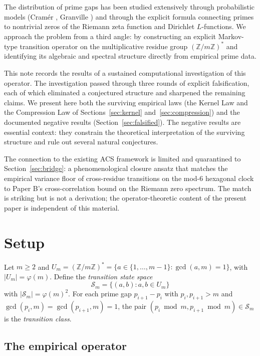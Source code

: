 \documentclass[11pt,a4paper]{article}
\begin{document}
The distribution of prime gaps has been studied extensively through probabilistic models (Cram\'{e}r \cite{Cramer}, Granville \cite{Granville}) and through the explicit formula connecting primes to nontrivial zeros of the Riemann zeta function and Dirichlet $L$-functions. We approach the problem from a third angle: by constructing an explicit Markov-type transition operator on the multiplicative residue group $(\mathbb{Z}/m\mathbb{Z})^*$ and identifying its algebraic and spectral structure directly from empirical prime data.

This note records the results of a sustained computational investigation of this operator. The investigation passed through three rounds of explicit falsification, each of which eliminated a conjectured structure and sharpened the remaining claims. We present here both the surviving empirical laws (the Kernel Law and the Compression Law of Sections~\ref{sec:kernel} and~\ref{sec:compression}) and the documented negative results (Section~\ref{sec:falsified}). The negative results are essential context: they constrain the theoretical interpretation of the surviving structure and rule out several natural conjectures.

The connection to the existing ACS framework \cite{Wallace2026a, WallaceB, WallaceC} is limited and quarantined to Section~\ref{sec:bridge}: a phenomenological closure ansatz that matches the empirical variance floor of cross-residue transitions on the mod-6 hexagonal clock to Paper B's cross-correlation bound on the Riemann zero spectrum. The match is striking but is not a derivation; the operator-theoretic content of the present paper is independent of this material.

\section{Setup}
\label{sec:setup}

Let $m \geq 2$ and $U_m = (\mathbb{Z}/m\mathbb{Z})^* = \{a \in \{1, \ldots, m-1\} : \gcd(a, m) = 1\}$, with $|U_m| = \varphi(m)$. Define the \emph{transition state space}
\begin{equation}
\mathcal{S}_m = \{(a, b) : a, b \in U_m\}
\end{equation}
with $|\mathcal{S}_m| = \varphi(m)^2$. For each prime gap $p_{i+1} - p_i$ with $p_i, p_{i+1} > m$ and $\gcd(p_i, m) = \gcd(p_{i+1}, m) = 1$, the pair $(p_i \bmod m, p_{i+1} \bmod m) \in \mathcal{S}_m$ is the \emph{transition class}.

\subsection{The empirical operator}
\end{document}
